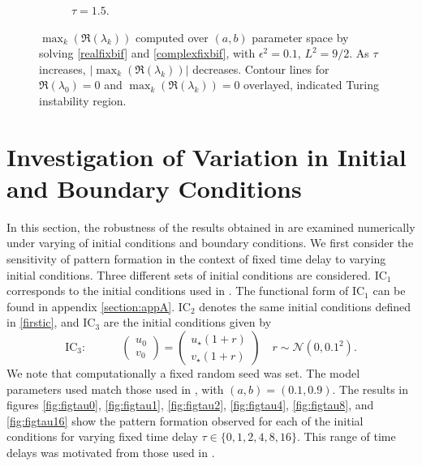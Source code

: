 \begin{figure}[H]
\begin{subfigure}[t]{0.45\textwidth}
        \caption{$\tau=1.5$.}
        \label{}
    \end{subfigure}
    \caption{$\max_k(\Re(\lambda_k))$ computed over $(a,b)$ parameter space by solving \eqref{realfixbif} and \eqref{complexfixbif}, with $\epsilon^2=0.1$, $L^2=9/2$. As $\tau$ increases, $|\max_k(\Re(\lambda_k))|$ decreases. Contour lines for $\Re(\lambda_0)=0$ and $\max_k(\Re(\lambda_k))=0$ overlayed, indicated Turing instability region.}
    \label{fig:fixbif2}
\end{figure}
\section{Investigation of Variation in Initial and Boundary Conditions}
In this section, the robustness of the results obtained in \cite{gaffmonk} are examined numerically under varying of initial conditions and boundary conditions. We first consider the sensitivity of pattern formation in the context of fixed time delay to varying initial conditions. Three different sets of initial conditions are considered. $\text{IC}_1$ corresponds to the initial conditions used in \cite{gaffmonk}. The functional form of $\text{IC}_1$ can be found in appendix \ref{section:appA}. $\text{IC}_2$ denotes the same initial conditions defined in \eqref{firstic}, and $\text{IC}_3$ are the initial conditions given by
\begin{equation}\label{ic3}
\text{IC}_3:\quad\quad\quad\begin{pmatrix}u_0\\v_0\end{pmatrix}=\begin{pmatrix}u_\star(1+r)\\v_\star(1+r)\end{pmatrix}\quad r\sim\mathcal{N}\left(0,0.1^2\right).
\end{equation}
We note that computationally a fixed random seed was set. The model parameters used match those used in \cite{gaffmonk}, with $(a,b)=(0.1,0.9)$. The results in figures \ref{fig:figtau0}, \ref{fig:figtau1}, \ref{fig:figtau2}, \ref{fig:figtau4}, \ref{fig:figtau8}, and \ref{fig:figtau16} show the pattern formation observed for each of the initial conditions for varying fixed time delay $\tau\in\{0,1,2,4,8,16 \}$. This range of time delays was motivated from those used in \cite{gaffmonk}.

